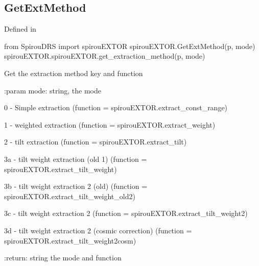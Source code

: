 \noindent\begin{minipage}{\textwidth}
\subsection{GetExtMethod}

Defined in \spirouEXTOR{}
\begin{pythonbox}
from SpirouDRS import spirouEXTOR
spirouEXTOR.GetExtMethod(p, mode)
spirouEXTOR.spirouEXTOR.get_extraction_method(p, mode)
\end{pythonbox}

\begin{pythondocstring}
Get the extraction method key and function

:param mode: string, the mode

    0 - Simple extraction
            (function = spirouEXTOR.extract_const_range)

    1 - weighted extraction
            (function = spirouEXTOR.extract_weight)

    2 - tilt extraction
            (function = spirouEXTOR.extract_tilt)

    3a - tilt weight extraction (old 1)
            (function = spirouEXTOR.extract_tilt_weight)

    3b - tilt weight extraction 2 (old)
            (function = spirouEXTOR.extract_tilt_weight_old2)

    3c - tilt weight extraction 2
            (function = spirouEXTOR.extract_tilt_weight2)

    3d - tilt weight extraction 2 (cosmic correction)
            (function = spirouEXTOR.extract_tilt_weight2cosm)

:return: string the mode and function
\end{pythondocstring}
\end{minipage}

